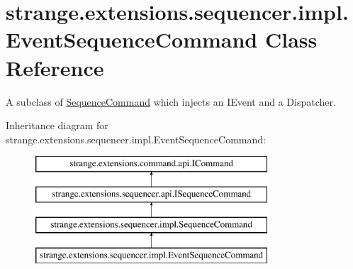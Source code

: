 \hypertarget{classstrange_1_1extensions_1_1sequencer_1_1impl_1_1_event_sequence_command}{\section{strange.\-extensions.\-sequencer.\-impl.\-Event\-Sequence\-Command Class Reference}
\label{classstrange_1_1extensions_1_1sequencer_1_1impl_1_1_event_sequence_command}
}


A subclass of \hyperlink{classstrange_1_1extensions_1_1sequencer_1_1impl_1_1_sequence_command}{Sequence\-Command} which injects an I\-Event and a Dispatcher.  


Inheritance diagram for strange.\-extensions.\-sequencer.\-impl.\-Event\-Sequence\-Command\-:\begin{figure}[H]
\begin{center}
\leavevmode
\includegraphics[height=4.000000cm]{classstrange_1_1extensions_1_1sequencer_1_1impl_1_1_event_sequence_command}
\end{center}
\end{figure}
